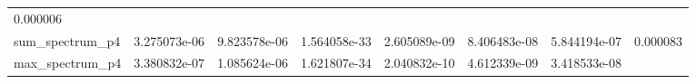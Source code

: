 \documentclass[11pt]{article}
\begin{document}
\begin{longtable}[]{@{}llllllll@{}}
\begin{minipage}[t]{0.08\columnwidth}
0.000006\strut
\end{minipage}\tabularnewline
\begin{minipage}[t]{0.16\columnwidth}\raggedright
sum\_spectrum\_p4\strut
\end{minipage} & \begin{minipage}[t]{0.09\columnwidth}\raggedright
3.275073e-06\strut
\end{minipage} & \begin{minipage}[t]{0.09\columnwidth}\raggedright
9.823578e-06\strut
\end{minipage} & \begin{minipage}[t]{0.09\columnwidth}\raggedright
1.564058e-33\strut
\end{minipage} & \begin{minipage}[t]{0.09\columnwidth}\raggedright
2.605089e-09\strut
\end{minipage} & \begin{minipage}[t]{0.09\columnwidth}\raggedright
8.406483e-08\strut
\end{minipage} & \begin{minipage}[t]{0.09\columnwidth}\raggedright
5.844194e-07\strut
\end{minipage} & \begin{minipage}[t]{0.08\columnwidth}\raggedright
0.000083\strut
\end{minipage}\tabularnewline
\begin{minipage}[t]{0.16\columnwidth}\raggedright
max\_spectrum\_p4\strut
\end{minipage} & \begin{minipage}[t]{0.09\columnwidth}\raggedright
3.380832e-07\strut
\end{minipage} & \begin{minipage}[t]{0.09\columnwidth}\raggedright
1.085624e-06\strut
\end{minipage} & \begin{minipage}[t]{0.09\columnwidth}\raggedright
1.621807e-34\strut
\end{minipage} & \begin{minipage}[t]{0.09\columnwidth}\raggedright
2.040832e-10\strut
\end{minipage} & \begin{minipage}[t]{0.09\columnwidth}\raggedright
4.612339e-09\strut
\end{minipage} & \begin{minipage}[t]{0.09\columnwidth}\raggedright
3.418533e-08\strut
\end{minipage} & \begin{minipage}[t]{0.08\columnwidth}\raggedright

\end{minipage}
\end{longtable}
\end{document}
